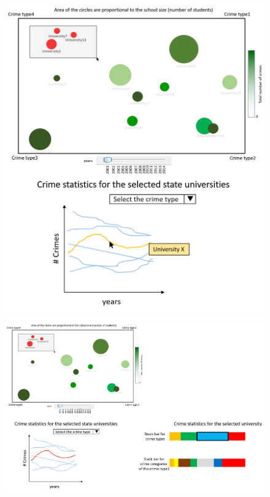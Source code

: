 \documentclass[12pt]{article}
\begin{document}
\begin{figure}[tbph]
   \centering{}
	       \includegraphics[width=6in]{prot2-2}           
\caption{}
\label{fig:p2-2}
\end{figure}

\begin{figure}[tbph]
   \centering{}
	       \includegraphics[width=6in]{prot2-3}           
\caption{}
\label{fig:p2-3}
\end{figure}
\end{document}
